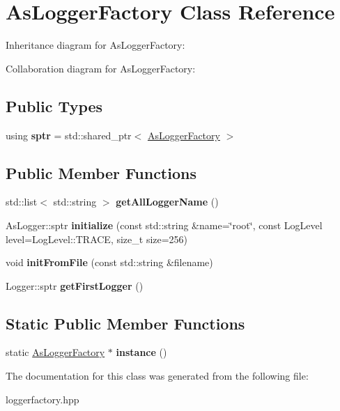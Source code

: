\hypertarget{classAsLoggerFactory}{}\section{As\+Logger\+Factory Class Reference}
\label{classAsLoggerFactory}


Inheritance diagram for As\+Logger\+Factory\+:


Collaboration diagram for As\+Logger\+Factory\+:
\subsection*{Public Types}
\begin{DoxyCompactItemize}
\item 
\mbox{\label{classAsLoggerFactory_aa2137ee7119a432b727459dbb823e3ea}} 
using {\bfseries sptr} = std\+::shared\+\_\+ptr$<$ \hyperlink{classAsLoggerFactory}{As\+Logger\+Factory} $>$
\end{DoxyCompactItemize}
\subsection*{Public Member Functions}
\begin{DoxyCompactItemize}
\item 
\mbox{\label{classAsLoggerFactory_a73115065bb620d8f21867259d861dd17}} 
std\+::list$<$ std\+::string $>$ {\bfseries get\+All\+Logger\+Name} ()
\item 
\mbox{\label{classAsLoggerFactory_a28dac41799f8267cf6ca91a416e9b5ef}} 
As\+Logger\+::sptr {\bfseries initialize} (const std\+::string \&name=\char`\"{}root\char`\"{}, const Log\+Level level=Log\+Level\+::\+T\+R\+A\+CE, size\+\_\+t size=256)
\item 
\mbox{\label{classAsLoggerFactory_a5f6804bf44c862fce8743bcecda7c2e0}} 
void {\bfseries init\+From\+File} (const std\+::string \&filename)
\item 
\mbox{\label{classAsLoggerFactory_a92b65402f2555446b0565899ec54e5bd}} 
Logger\+::sptr {\bfseries get\+First\+Logger} ()
\end{DoxyCompactItemize}
\subsection*{Static Public Member Functions}
\begin{DoxyCompactItemize}
\item 
\mbox{\label{classAsLoggerFactory_a5496a6eeccc2f039b44bcc3724eb817b}} 
static \hyperlink{classAsLoggerFactory}{As\+Logger\+Factory} $\ast$ {\bfseries instance} ()
\end{DoxyCompactItemize}


The documentation for this class was generated from the following file\+:\begin{DoxyCompactItemize}
\item 
loggerfactory.\+hpp\end{DoxyCompactItemize}

